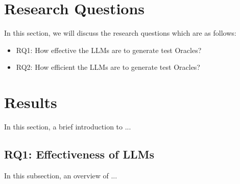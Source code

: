 \section{Research Questions}
\label{sec:research_questions}
\vspace{0.2 cm}

In this section, we will discuss the research questions which are as follows:
\begin{itemize}
  \item RQ1: How effective the LLMs are to generate test Oracles?
  \item RQ2: How efficient the LLMs are to generate test Oracles?
\end{itemize}

\section{Results}
\label{sec:results}
\vspace{0.2 cm}

In this section, a brief introduction to ... 

\vspace{0.1 cm}
\subsection{RQ1: Effectiveness of LLMs}
\label{sec:results_rq1}
\vspace{0.1 cm}

In this subsection, an overview of ...




